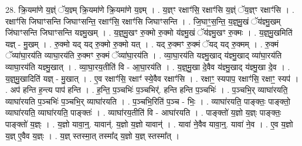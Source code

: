 \documentclass[17pt]{extarticle}
\begin{document}
28. क्रि॒यमा॑णे य॒ज्ञ्ं ॅय॒ज्ञ्म् क्रि॒यमा॑णे क्रि॒यमा॑णे य॒ज्ञ्म् । . य॒ज्ञ्ꣳ रक्षाꣳ॑सि॒ रक्षाꣳ॑सि य॒ज्ञ्ं ॅय॒ज्ञ्ꣳ रक्षाꣳ॑सि । . रक्षाꣳ॑सि जिघाꣳसन्ति जिघाꣳसन्ति॒ रक्षाꣳ॑सि॒ रक्षाꣳ॑सि जिघाꣳसन्ति । . जि॒घाꣳ॒॒स॒न्ति॒ य॒ज्ञ्॒मु॒खं ॅय॑ज्ञ्मु॒खम् जि॑घाꣳसन्ति जिघाꣳसन्ति यज्ञ्मु॒खम् । . य॒ज्ञ्॒मु॒खꣳ रु॒क्मो रु॒क्मो य॑ज्ञ्मु॒खं ॅय॑ज्ञ्मु॒खꣳ रु॒क्मः । . य॒ज्ञ्॒मु॒खमिति॑ यज्ञ् - मु॒खम् । . रु॒क्मो यद् यद् रु॒क्मो रु॒क्मो यत् । . यद् रु॒क्मꣳ रु॒क्मं ॅयद् यद् रु॒क्मम् । . रु॒क्मं ॅव्या॑घा॒रय॑ति व्याघा॒रय॑ति रु॒क्मꣳ रु॒क्मं ॅव्या॑घा॒रय॑ति । . व्या॒घा॒रय॑ति यज्ञ्मु॒खाद् य॑ज्ञ्मु॒खाद् व्या॑घा॒रय॑ति व्याघा॒रय॑ति यज्ञ्मु॒खात् । . व्या॒घा॒रय॒तीति॑ वि - आ॒घा॒रय॑ति । . य॒ज्ञ्॒मु॒खा दे॒वैव य॑ज्ञ्मु॒खाद् य॑ज्ञ्मु॒खा दे॒व । . य॒ज्ञ्॒मु॒खादिति॑ यज्ञ् - मु॒खात् । . ए॒व रक्षाꣳ॑सि॒ रक्षाꣳ॑ स्ये॒वैव रक्षाꣳ॑सि । . रक्षाꣳ॒॒ स्यपाप॒ रक्षाꣳ॑सि॒ रक्षाꣳ॒॒ स्यप॑ । . अप॑ हन्ति ह॒न्त्य पाप॑ हन्ति । . ह॒न्ति॒ प॒ञ्चभिः॑ प॒ञ्चभिर्॑. हन्ति हन्ति प॒ञ्चभिः॑ । . प॒ञ्चभि॒र् व्याघा॑रयति॒ व्याघा॑रयति प॒ञ्चभिः॑ प॒ञ्चभि॒र् व्याघा॑रयति । . प॒ञ्चभि॒रिति॑ प॒ञ्च - भिः॒ । . व्याघा॑रयति॒ पाङ्क्तः॒ पाङ्क्तो॒ व्याघा॑रयति॒ व्याघा॑रयति॒ पाङ्क्तः॑ । . व्याघा॑रय॒तीति॑ वि - आघा॑रयति । . पाङ्क्तो॑ य॒ज्ञो य॒ज्ञ्ः पाङ्क्तः॒ पाङ्क्तो॑ य॒ज्ञ्ः । . य॒ज्ञो यावा॒न्॒. यावान्॑. य॒ज्ञो य॒ज्ञो यावान्॑ । . यावा॑ ने॒वैव यावा॒न्॒. यावा॑ ने॒व । . ए॒व य॒ज्ञो य॒ज्ञ् ए॒वैव य॒ज्ञ्ः । . य॒ज्ञ् स्तस्मा॒त् तस्मा᳚द् य॒ज्ञो य॒ज्ञ् स्तस्मा᳚त् । \newline
\end{document}
